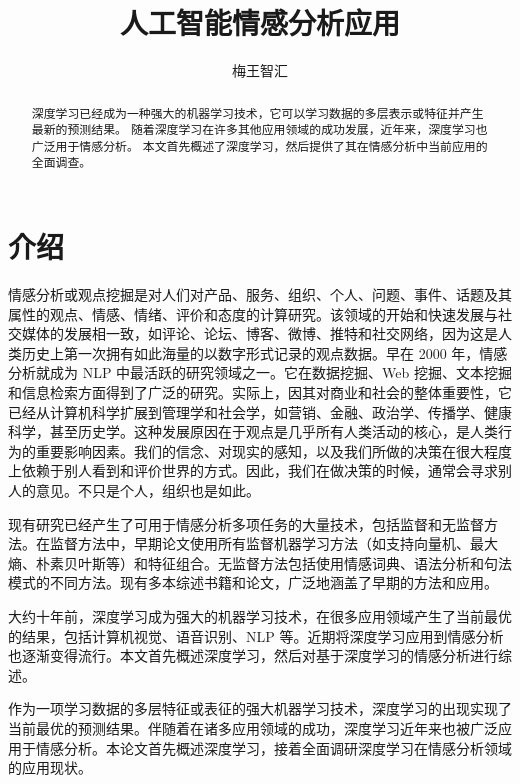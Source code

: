 \documentclass[lang=cn,11pt,a4paper]{elegantpaper}
\title{人工智能情感分析应用}
\author{梅王智汇}
\date{}
\begin{document}
\maketitle
\thispagestyle{fancy}         %
\fancyhead{}                     %
\lfoot{}
\cfoot{\thepage}  %
\rfoot{}
\renewcommand{\headrulewidth}{0pt}      %
\renewcommand{\footrulewidth}{0pt}

\begin{abstract}
深度学习已经成为一种强大的机器学习技术，它可以学习数据的多层表示或特征并产生最新的预测结果。 随着深度学习在许多其他应用领域的成功发展，近年来，深度学习也广泛用于情感分析。 本文首先概述了深度学习，然后提供了其在情感分析中当前应用的全面调查。
\end{abstract}

\section{介绍}
情感分析或观点挖掘是对人们对产品、服务、组织、个人、问题、事件、话题及其属性的观点、情感、情绪、评价和态度的计算研究。该领域的开始和快速发展与社交媒体的发展相一致，如评论、论坛、博客、微博、推特和社交网络，因为这是人类历史上第一次拥有如此海量的以数字形式记录的观点数据。早在 2000 年，情感分析就成为 NLP 中最活跃的研究领域之一。它在数据挖掘、Web 挖掘、文本挖掘和信息检索方面得到了广泛的研究。实际上，因其对商业和社会的整体重要性，它已经从计算机科学扩展到管理学和社会学，如营销、金融、政治学、传播学、健康科学，甚至历史学。这种发展原因在于观点是几乎所有人类活动的核心，是人类行为的重要影响因素。我们的信念、对现实的感知，以及我们所做的决策在很大程度上依赖于别人看到和评价世界的方式。因此，我们在做决策的时候，通常会寻求别人的意见。不只是个人，组织也是如此。

现有研究已经产生了可用于情感分析多项任务的大量技术，包括监督和无监督方法。在监督方法中，早期论文使用所有监督机器学习方法（如支持向量机、最大熵、朴素贝叶斯等）和特征组合。无监督方法包括使用情感词典、语法分析和句法模式的不同方法。现有多本综述书籍和论文，广泛地涵盖了早期的方法和应用。

大约十年前，深度学习成为强大的机器学习技术，在很多应用领域产生了当前最优的结果，包括计算机视觉、语音识别、NLP 等。近期将深度学习应用到情感分析也逐渐变得流行。本文首先概述深度学习，然后对基于深度学习的情感分析进行综述。

作为一项学习数据的多层特征或表征的强大机器学习技术，深度学习的出现实现了当前最优的预测结果。伴随着在诸多应用领域的成功，深度学习近年来也被广泛应用于情感分析。本论文首先概述深度学习，接着全面调研深度学习在情感分析领域的应用现状。
\end{document}
